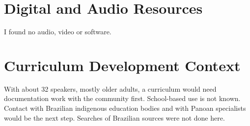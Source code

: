 \documentclass[12pt]{article}
\begin{document}
\section{Digital and Audio Resources}
I found no audio, video or software.

\section{Curriculum Development Context}
With about 32 speakers, mostly older adults, a curriculum would need documentation work with the community first. School-based use is not known. Contact with Brazilian indigenous education bodies and with Panoan specialists would be the next step. Searches of Brazilian sources were not done here.
\end{document}
